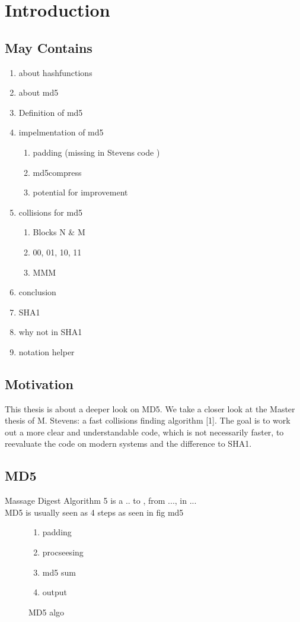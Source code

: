 \chapter{Introduction}
\section{May Contains}
\begin{enumerate}

    \item about hashfunctions
    \item about md5
    \item Definition of md5
    \item impelmentation of md5
        \begin{enumerate}
            \item padding (missing in Stevens code )
            \item md5compress
            \item potential for improvement 
        \end{enumerate}
    \item collisions for md5
        \begin{enumerate}
            \item Blocks N $\&$ M
            \item 00, 01, 10, 11
            \item MMM
        \end{enumerate}
    \item conclusion
    \item SHA1
    \item why not in SHA1
    \item notation helper

\end{enumerate}
\section*{Motivation}
This thesis is about a deeper look on MD5.
We take a closer look at the Master thesis of M. Stevens: a fast collisions finding algorithm [1].
The goal is to work out a more clear and understandable code, which is not necessarily faster, to reevaluate the code on modern systems and the difference to SHA1. 
\section{MD5}
Massage Digest Algorithm 5 is a .. to , from ..., in ... \\
MD5 is usually seen as 4 steps as seen in fig {md5}\\
\begin{figure}
    \begin{enumerate}
        \item padding
        \item procseesing
        \item md5 sum 
        \item output
    \end{enumerate}
\caption{MD5 algo}
\label{md5}
\end{figure}

